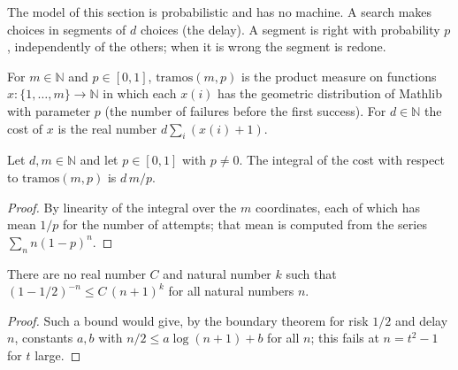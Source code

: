 The model of this section is probabilistic and has no machine. A search makes choices in segments of
$d$ choices (the delay). A segment is right with probability $p$, independently of the others; when
it is wrong the segment is redone.

\begin{definition}
  \label{def:search-tramos}
  \leanok
  For $m \in \mathbb{N}$ and $p \in [0, 1]$, $\mathrm{tramos}(m, p)$ is the product measure on
  functions $x : \{1, \dots, m\} \to \mathbb{N}$ in which each $x(i)$ has the geometric distribution
  of Mathlib with parameter $p$ (the number of failures before the first success). For
  $d \in \mathbb{N}$ the cost of $x$ is the real number $d \sum_i (x(i) + 1)$.
  \own{}
\end{definition}

\begin{theorem}
  \label{thm:search-costo-esperado}
  \leanok
  Let $d, m \in \mathbb{N}$ and let $p \in [0, 1]$ with $p \ne 0$. The integral of the cost with
  respect to $\mathrm{tramos}(m, p)$ is $d\,m / p$.
  \own{}
\end{theorem}

\begin{proof}
  \leanok
  By linearity of the integral over the $m$ coordinates, each of which has mean $1/p$ for the
  number of attempts; that mean is computed from the series $\sum_n n (1-p)^n$.
\end{proof}

\begin{theorem}
  \label{thm:search-a-ciegas-al-final}
  \leanok
  There are no real number $C$ and natural number $k$ such that
  $(1 - 1/2)^{-n} \le C\,(n + 1)^k$ for all natural numbers $n$.
  \own{}
\end{theorem}

\begin{proof}
  \leanok
  Such a bound would give, by the boundary theorem for risk $1/2$ and delay $n$, constants $a, b$
  with $n/2 \le a \log(n+1) + b$ for all $n$; this fails at $n = t^2 - 1$ for $t$ large.
\end{proof}

